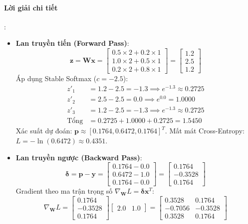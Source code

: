 \paragraph{Lời giải chi tiết}:
\begin{itemize}
  \item[1)] \textbf{Lan truyền tiến (Forward Pass)}:
  \begin{equation*}
  \mathbf{z} = \mathbf{W}\mathbf{x} = \begin{bmatrix} 0.5 \times 2 + 0.2 \times 1 \\ 1.0 \times 2 + 0.5 \times 1 \\ 0.2 \times 2 + 0.8 \times 1 \end{bmatrix} = \begin{bmatrix} 1.2 \\ 2.5 \\ 1.2 \end{bmatrix}
  \end{equation*}
  Áp dụng Stable Softmax ($c = -2.5$):
  \begin{align*}
  z'_1 &= 1.2 - 2.5 = -1.3 \implies e^{-1.3} \approx 0.2725 \\
  z'_2 &= 2.5 - 2.5 = 0.0 \implies e^{0.0} = 1.0000 \\
  z'_3 &= 1.2 - 2.5 = -1.3 \implies e^{-1.3} \approx 0.2725 \\
  \text{Tổng} &= 0.2725 + 1.0000 + 0.2725 = 1.5450
  \end{align*}
  Xác suất dự đoán: $\mathbf{p} \approx [0.1764, 0.6472, 0.1764]^T$.
  Mất mát Cross-Entropy: $L = -\ln(0.6472) \approx 0.4351$.

  \item[2)] \textbf{Lan truyền ngược (Backward Pass)}:
  \begin{equation*}
  \boldsymbol{\delta} = \mathbf{p} - \mathbf{y} = \begin{bmatrix} 0.1764 - 0.0 \\ 0.6472 - 1.0 \\ 0.1764 - 0.0 \end{bmatrix} = \begin{bmatrix} 0.1764 \\ -0.3528 \\ 0.1764 \end{bmatrix}
  \end{equation*}
  Gradient theo ma trận trọng số $\nabla_\mathbf{W} L = \boldsymbol{\delta} \mathbf{x}^T$:
  \begin{equation*}
  \nabla_\mathbf{W} L = \begin{bmatrix} 0.1764 \\ -0.3528 \\ 0.1764 \end{bmatrix} \begin{bmatrix} 2.0 & 1.0 \end{bmatrix} = \begin{bmatrix} 0.3528 & 0.1764 \\ -0.7056 & -0.3528 \\ 0.3528 & 0.1764 \end{bmatrix}
  \end{equation*}


\end{itemize}

